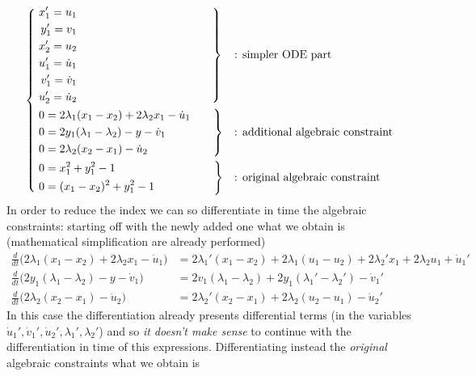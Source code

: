 	\begin{equation} 
		\left\{ \begin{aligned}
			&\left. \begin{aligned}
				x_1' = u_1 \\ y_1' = v_1 \\ x_2' = u_2 \\ u_1' = \dot u_1 \\ v_1' = \dot v_1 \\ u_2' = \dot u_2
			\end{aligned} \hspace{42mm} \right\} &&\textrm{: simpler ODE part} \\
			&\left. \begin{aligned}
				&0 = 2\lambda_1(x_1-x_2) + 2 \lambda_2 x_1 - \dot u_1 \\
				&0 = 2y_1(\lambda_1-\lambda_2) - y - \dot v_1 \\
				&0 =  2\lambda_2 (x_2-x_1) - \dot u_2
			\end{aligned} \qquad \right\} &&\textrm{: additional algebraic constraint} \\
			&\left. \begin{aligned}
				&0 = x_1^2 + y_1^2 - 1 \\
				&0 = (x_1-x_2)^2 + y_1^2 - 1
			\end{aligned} \hspace{18.5mm} \right\} &&\textrm{: original algebraic constraint}
		\end{aligned} \right. 
	\end{equation}
	In order to reduce the index we can so differentiate in time the algebraic constraints: starting off with the newly added one what we obtain is (mathematical simplification are already performed)
	\begin{align*}
		\frac d{dt} \big( 2\lambda_1(x_1-x_2) + 2 \lambda_2 x_1 - \dot u_1 \big) & = 2 \lambda_1' (x_1-x_2) + 2\lambda_1(u_1 - u_2) + 2 \lambda_2' x_1 + 2\lambda_2 u_1 + \dot u_1' \\
		\frac d{dt} \big( 2y_1(\lambda_1-\lambda_2) - y - \dot v_1 \big) & = 2v_1 (\lambda_1 - \lambda_2) +2 y_1(\lambda_1'-\lambda_2') - \dot v_1' \\
		\frac d{dt} \big( 2\lambda_2 (x_2-x_1) - \dot u_2 \big) & = 2\lambda_2' (x_2 - x_1) + 2 \lambda_2(u_2 - u_1) - \dot u_2'
	\end{align*}
	In this case the differentiation already presents differential terms (in the variables $\dot u_1', \dot v_1', \dot u_2', \lambda_1', \lambda_2'$) and so \textit{it doesn't make sense} to continue with the differentiation in time of this expressions. Differentiating instead the \textit{original} algebraic constraints what we obtain is
